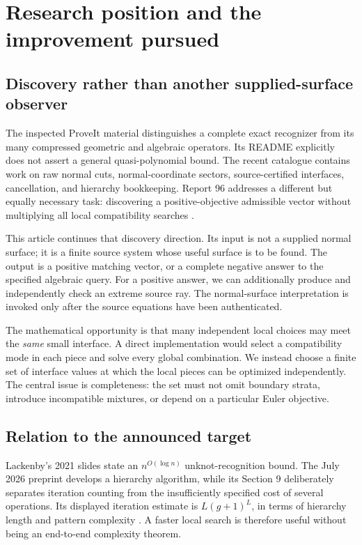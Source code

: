 \section{Research position and the improvement pursued}
\label{sec:position}

\subsection{Discovery rather than another supplied-surface observer}
The inspected ProveIt material distinguishes a complete exact recognizer from its many compressed geometric and algebraic operators. Its README explicitly does not assert a general quasi-polynomial bound. The recent catalogue contains work on raw normal cuts, normal-coordinate sectors, source-certified interfaces, cancellation, and hierarchy bookkeeping. Report 96 addresses a different but equally necessary task: discovering a positive-objective admissible vector without multiplying all local compatibility searches \cite{repo,scalar}.

This article continues that discovery direction. Its input is not a supplied normal surface; it is a finite source system whose useful surface is to be found. The output is a positive matching vector, or a complete negative answer to the specified algebraic query. For a positive answer, we can additionally produce and independently check an extreme source ray. The normal-surface interpretation is invoked only after the source equations have been authenticated.

The mathematical opportunity is that many independent local choices may meet the \emph{same} small interface. A direct implementation would select a compatibility mode in each piece and solve every global combination. We instead choose a finite set of interface values at which the local pieces can be optimized independently. The central issue is completeness: the set must not omit boundary strata, introduce incompatible mixtures, or depend on a particular Euler objective.

\subsection{Relation to the announced target}
Lackenby's 2021 slides state an $n^{O(\log n)}$ unknot-recognition bound. The July 2026 preprint develops a hierarchy algorithm, while its Section 9 deliberately separates iteration counting from the insufficiently specified cost of several operations. Its displayed iteration estimate is $L(g+1)^L$, in terms of hierarchy length and pattern complexity \cite{slides,lack2026}. A faster local search is therefore useful without being an end-to-end complexity theorem.

